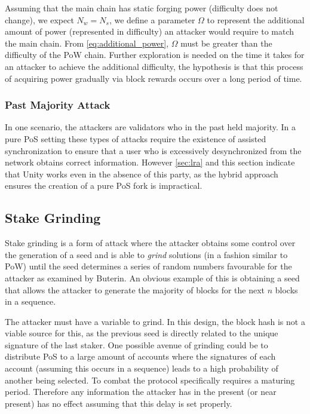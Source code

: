 \documentclass[a4paper]{article}
\begin{document}
Assuming that the main chain has static forging power (difficulty does not change), we expect $N_w = N_s$, we define a parameter $\Omega$ to represent the additional amount of power (represented in difficulty) an attacker would require to match the main chain. From \cref{eq:additional_power}, $\Omega$ must be greater than the difficulty of the PoW chain. Further exploration is needed on the time it takes for an attacker to achieve the additional difficulty, the hypothesis is that this process of acquiring power gradually via block rewards occurs over a long period of time.

\subsubsection{Past Majority Attack}

In one scenario, the attackers are validators who in the past held majority. In a pure PoS setting these types of attacks require the existence of assisted synchronization to ensure that a user who is excessively desynchronized from the network obtains correct information. However \cref{sec:lra} and this section indicate that Unity works even in the absence of this party, as the hybrid approach ensures the creation of a pure PoS fork is impractical.

\subsection{Stake Grinding}
\label{sec:stake_grinding}

Stake grinding is a form of attack where the attacker obtains some control over the generation of a seed and is able to \textit{grind} solutions (in a fashion similar to PoW) until the seed determines a series of random numbers favourable for the attacker as examined by Buterin\cite{buterin_randomness}. An obvious example of this is obtaining a seed that allows the attacker to generate the majority of blocks for the next $n$ blocks in a sequence.

The attacker must have a variable to grind. In this design, the block hash is not a viable source for this, as the previous seed is directly related to the unique signature of the last staker. One possible avenue of grinding could be to distribute PoS to a large amount of accounts where the signatures of each account (assuming this occurs in a sequence) leads to a high probability of another being selected. To combat the protocol specifically requires a maturing period. Therefore any information the attacker has in the present (or near present) has no effect assuming that this delay is set properly.
\end{document}
